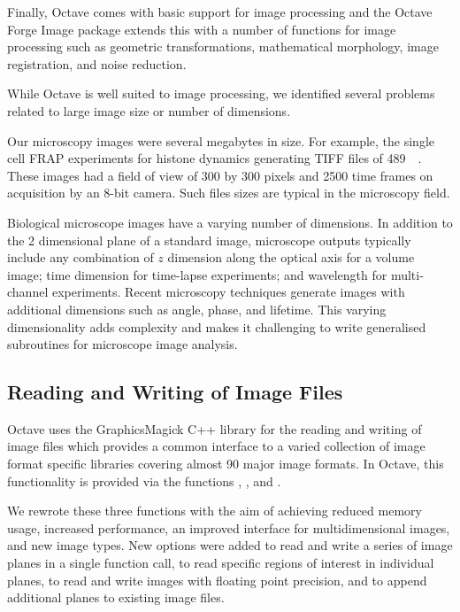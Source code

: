 Finally, Octave comes with basic support for image processing and the
Octave Forge Image package extends this with a number of functions for
image processing such as geometric transformations, mathematical
morphology, image registration, and noise reduction.

While Octave is well suited to image
processing, we identified several problems related to
large image size or number of dimensions.

Our microscopy images
were several megabytes in size.  For example, the single cell
FRAP experiments for histone dynamics generating
TIFF files of \SI{489}{\mebi\byte}.
These images had a field of view of 300
by 300 pixels and 2500 time frames
on acquisition by an 8-bit camera.
Such files sizes are typical in the microscopy field.

Biological microscope images have a varying number of dimensions.
In addition to the 2 dimensional plane of a standard image, microscope
outputs typically include any combination of $z$ dimension along
the optical axis for a volume image; time dimension for time-lapse
experiments; and wavelength for multi-channel experiments.  Recent microscopy
techniques generate images with additional dimensions
such as angle, phase, and lifetime.  This varying dimensionality adds
complexity and makes it challenging to write generalised subroutines for
microscope image analysis.

\subsection{Reading and Writing of Image Files}

Octave uses the GraphicsMagick C++ library for the reading and writing
of image files which provides a common interface
to a varied collection of
image format specific libraries covering almost
90 major image formats.  In Octave, this functionality is
provided via the functions , , and
.

We rewrote these three functions with the aim of achieving
reduced memory usage, increased performance, an improved
interface for multidimensional images, and new image types.
New options were added to read and write a series of image planes
in a single function call, to read specific regions of interest in
individual planes, to read and write images
with floating point precision, and to append additional planes to existing image
files.


